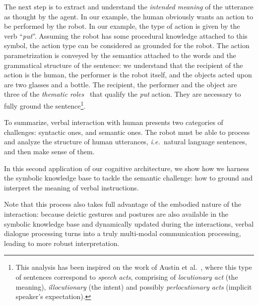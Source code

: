 \documentclass{svmult}
\newcommand{\ie}{{\textit{i.e.~}}}
\begin{document}
The next step is to extract and understand the \emph{intended meaning} of the
utterance as thought by the agent. In our example, the human obviously wants an
action to be performed by the robot. In our example, the type of action is
given by the verb ``\textit{put}''. Assuming the robot has some procedural
knowledge attached to this symbol, the action type can be considered as
grounded for the robot. The action parametrization is conveyed by the semantics
attached to the words and the grammatical structure of the sentence: we
understand that the recipient of the action is the human, the performer is the
robot itself, and the objects acted upon are two glasses and a bottle. The
recipient, the performer and the object are three of the \emph{thematic
roles}~\cite{Gruber1965} that qualify the \emph{put} action. They are necessary
to fully ground the sentence\footnote{This analysis has been inspired on the
work of Austin et al.~\cite{Austin1962}, where this type of sentences
correspond to \emph{speech acts}, comprising of \emph{locutionary act} (the
meaning), \emph{illocutionary} (the intent) and possibly \emph{perlocutionary
acts} (implicit speaker's expectation).}.

To summarize, verbal interaction with human presents two categories of challenges: syntactic
ones, and semantic ones. The robot must be able to process and analyze the
structure of human utterances, \ie natural language sentences, and then make
sense of them. 

In this second application of our cognitive architecture, we show how we
harness the symbolic knowledge base to tackle the semantic challenge: how to
ground and interpret the meaning of verbal instructions.

Note that this process also takes full advantage of the embodied nature of the
interaction: because deictic gestures and postures are also available in the
symbolic knowledge base and dynamically updated during the interactions, verbal
dialogue processing turns into a truly multi-modal communication processing,
leading to more robust interpretation.
\end{document}

